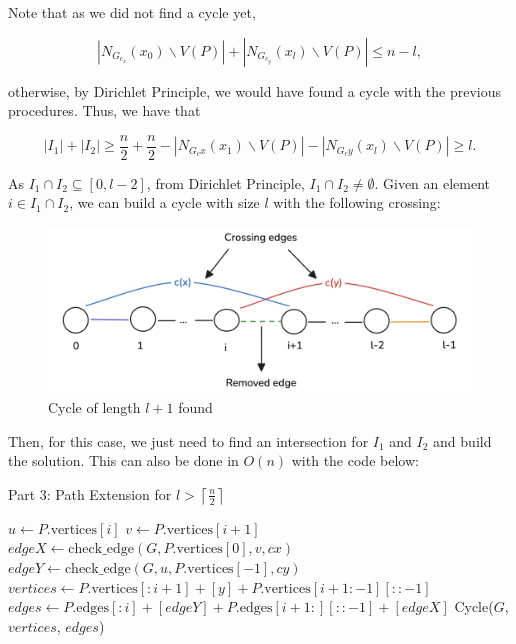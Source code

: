Note that as we did not find a cycle yet, 

$$
|N_{G_{c_x}}(x_0) \backslash V(P)| + |N_{G_{c_y}}(x_l) \backslash V(P)| \leq n - l,
$$

otherwise, by Dirichlet Principle, we would have found a cycle
with the previous procedures. Thus, we have that

$$
|I_1| + |I_2| \geq \frac{n}{2} + \frac{n}{2} - |N_{G_cx}(x_1) \backslash V(P)| - |N_{G_cy}(x_l) \backslash V(P)| \geq l.
$$

As $I_1 \cap I_2 \subseteq [0, l - 2]$, from Dirichlet Principle, $I_1 \cap I_2 \neq \emptyset$. Given an element
$i \in I_1 \cap I_2$, we can build a cycle with size $l$ with
the following crossing:

\begin{figure}[H]
    \centering
    \includegraphics[width=1\textwidth]{figuras/path_cycle_crossing.png}
    \caption{Cycle of length \( l + 1 \) found}
    \label{fig:path_cycle_crossing}
\end{figure}

Then, for this case, we just need to find an intersection
for $I_1$ and $I_2$ and build the solution. This can also
be done in $O(n)$ with the code below:

\begin{algorithm}[H]
    \caption{Part 3: Path Extension for \( l > \left \lceil \frac{n}{2} \right \rceil \)}
    \begin{algorithmic}[1]
                \State $u \gets P.\text{vertices}[i]$
                \State $v \gets P.\text{vertices}[i + 1]$
                \State $edgeX \gets \text{check\_edge}(G, P.\text{vertices}[0], v, cx)$
                \State $edgeY \gets \text{check\_edge}(G, u, P.\text{vertices}[-1], cy)$
                    \State $vertices \gets P.\text{vertices}[:i + 1] + [y] + P.\text{vertices}[i + 1:-1][::-1]$
                    \State $edges \gets P.\text{edges}[:i] + [edgeY] + P.\text{edges}[i + 1:][::-1] + [edgeX]$
                    \State \Return Cycle($G$, $vertices$, $edges$)
                \EndIf
            \EndFor
            \State \Return {} 
        \EndFunction
    \end{algorithmic}
\end{algorithm}


